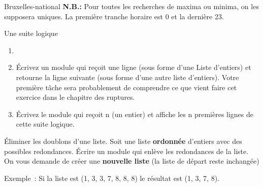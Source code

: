 \begin{Exercice}{Bruxelles-national}
	\textbf{N.B.:} Pour toutes les recherches de maxima ou minima, on les
	supposera uniques. La première tranche horaire est 0 et la dernière 23.
\end{Exercice}

\begin{Exercice}{Une suite logique}

	\begin{enumerate}[label=\alph*)]
		\item 
			\begin{center}
			\begin{minipage}{4.748cm}
			{}

			{}

			{}

			{}

			{}

			{}

			{}

			{}

			{}

			{}
			\end{minipage}
			\end{center}
		\item 
			Écrivez un module qui reçoit une ligne (sous forme
			d'une Liste d'entiers) et retourne la
			ligne suivante (sous forme d'une autre liste
			d'entiers). Votre première tâche sera probablement de
			comprendre ce que vient faire cet exercice dans le chapitre des
			ruptures.
		\item 
			Écrivez le module qui reçoit n (un entier) 
			et affiche les n premières lignes de cette suite
			logique.
	\end{enumerate}
\end{Exercice}

\begin{Exercice}{Éliminer les doublons d'une liste.}
	Soit une liste \textbf{ordonnée}
	d'entiers avec des possibles redondances. Écrire un
	module qui enlève les redondances de la liste. On vous demande de créer
	une \textbf{nouvelle liste} (la liste de départ reste inchangée)

	Exemple~: Si la liste est (1, 3, 3, 7, 8, 8, 8) le résultat est (1, 3, 7, 8).
\end{Exercice}
